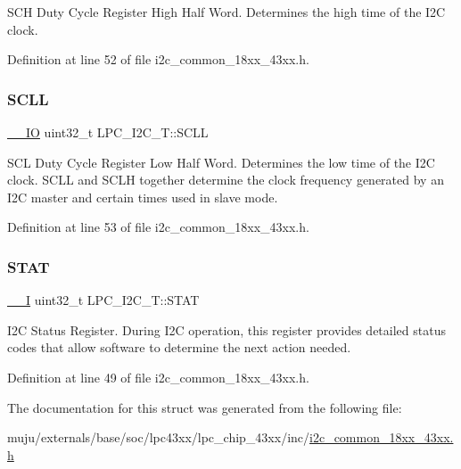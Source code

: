 S\+CH Duty Cycle Register High Half Word. Determines the high time of the I2C clock. 

Definition at line 52 of file i2c\+\_\+common\+\_\+18xx\+\_\+43xx.\+h.

\mbox{\label{struct_l_p_c___i2_c___t_a1cd0d0f95f90d6e6c3380f112144085b}} 
\subsubsection{\texorpdfstring{S\+C\+LL}{SCLL}}
{\footnotesize\ttfamily \hyperlink{core__sc300_8h_aec43007d9998a0a0e01faede4133d6be}{\+\_\+\+\_\+\+IO} uint32\+\_\+t L\+P\+C\+\_\+\+I2\+C\+\_\+\+T\+::\+S\+C\+LL}

S\+CL Duty Cycle Register Low Half Word. Determines the low time of the I2C clock. S\+C\+LL and S\+C\+LH together determine the clock frequency generated by an I2C master and certain times used in slave mode. 

Definition at line 53 of file i2c\+\_\+common\+\_\+18xx\+\_\+43xx.\+h.

\mbox{\label{struct_l_p_c___i2_c___t_ae806722ff38a93680338e5607d96156d}} 
\subsubsection{\texorpdfstring{S\+T\+AT}{STAT}}
{\footnotesize\ttfamily \hyperlink{core__sc300_8h_af63697ed9952cc71e1225efe205f6cd3}{\+\_\+\+\_\+I} uint32\+\_\+t L\+P\+C\+\_\+\+I2\+C\+\_\+\+T\+::\+S\+T\+AT}

I2C Status Register. During I2C operation, this register provides detailed status codes that allow software to determine the next action needed. 

Definition at line 49 of file i2c\+\_\+common\+\_\+18xx\+\_\+43xx.\+h.



The documentation for this struct was generated from the following file\+:\begin{DoxyCompactItemize}
\item 
muju/externals/base/soc/lpc43xx/lpc\+\_\+chip\+\_\+43xx/inc/\hyperlink{i2c__common__18xx__43xx_8h}{i2c\+\_\+common\+\_\+18xx\+\_\+43xx.\+h}\end{DoxyCompactItemize}
